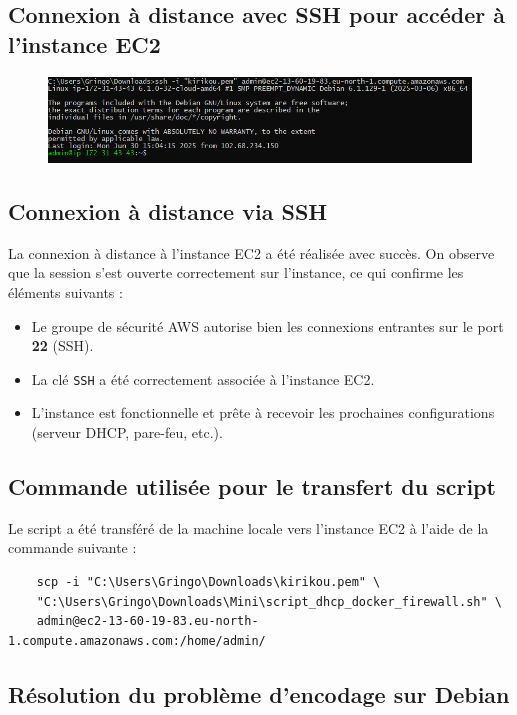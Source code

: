 \subsection{Connexion à distance avec SSH pour accéder à l’instance EC2}
\begin{figure}[h!]
	\centering
	\includegraphics[width=1\linewidth]{corps/images/image9}
	\label{fig:9}
\end{figure}

\subsection{Connexion à distance via SSH}
La connexion à distance à l'instance EC2 a été réalisée avec succès. On observe que la session s’est ouverte correctement sur l’instance, ce qui confirme les éléments suivants :

\begin{itemize}
	\item Le groupe de sécurité AWS autorise bien les connexions entrantes sur le port \textbf{22} (SSH).
	\item La clé \texttt{SSH} a été correctement associée à l’instance EC2.
	\item L’instance est fonctionnelle et prête à recevoir les prochaines configurations (serveur DHCP, pare-feu, etc.).
\end{itemize}

\subsection*{Commande utilisée pour le transfert du script}

Le script a été transféré de la machine locale vers l’instance EC2 à l’aide de la commande suivante :

\begin{lstlisting}
	scp -i "C:\Users\Gringo\Downloads\kirikou.pem" \
	"C:\Users\Gringo\Downloads\Mini\script_dhcp_docker_firewall.sh" \
	admin@ec2-13-60-19-83.eu-north-1.compute.amazonaws.com:/home/admin/
\end{lstlisting}

\subsection*{Résolution du problème d'encodage sur Debian}

